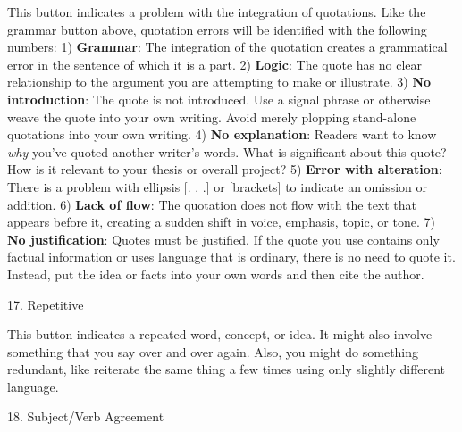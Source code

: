 This button indicates a problem with the integration of quotations. Like the
grammar button above, quotation errors will be identified with the following
numbers: 1) \textbf{Grammar}: The integration of the quotation creates a
grammatical error in the sentence of which it is a part. 2) \textbf{Logic}: The
quote has no clear relationship to the argument you are attempting to make or
illustrate. 3) \textbf{No introduction}: The quote is not introduced. Use a
signal phrase or otherwise weave the quote into your own writing. Avoid merely
plopping stand-alone quotations into your own writing. 4) \textbf{No
explanation}: Readers want to know \emph{why} you've quoted another writer's
words. What is significant about this quote? How is it relevant to your thesis
or overall project? 5) \textbf{Error with alteration}: There is a problem with
ellipsis [. . .] or [brackets] to indicate an omission or addition. 6)
\textbf{Lack of flow}: The quotation does not flow with the text that appears
before it, creating a sudden shift in voice, emphasis, topic, or tone. 7)
\textbf{No justification}: Quotes must be justified. If the quote you use
contains only factual information or uses language that is ordinary, there is no
need to quote it. Instead, put the idea or facts into your own words and then
cite the author.

 \begin{center}
\bigskip

{\huge 17. Repetitive} \end{center}

This button indicates a repeated word, concept, or idea. It might also involve
something that you say over and over again. Also, you might do something
redundant, like reiterate the same thing a few times using only slightly
different language.

 \begin{center}
\bigskip

{\huge 18. Subject/Verb Agreement} \end{center}

